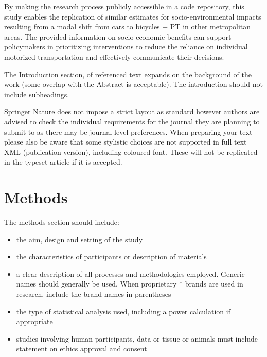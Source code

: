 \documentclass[sn-apa,referee,pdflatex]{sn-jnl}
\providecommand{\tightlist}{%
  \setlength{\itemsep}{0pt}\setlength{\parskip}{0pt}}
\begin{document}
By making the research process publicly accessible in a code repository,
this study enables the replication of similar estimates for
socio-environmental impacts resulting from a modal shift from cars to
bicycles + PT in other metropolitan areas. The provided information on
socio-economic benefits can support policymakers in prioritizing
interventions to reduce the reliance on individual motorized
transportation and effectively communicate their decisions.

The Introduction section, of referenced text \citet{bib1} expands on the
background of the work (some overlap with the Abstract is acceptable).
The introduction should not include subheadings.

Springer Nature does not impose a strict layout as standard however
authors are advised to check the individual requirements for the journal
they are planning to submit to as there may be journal-level
preferences. When preparing your text please also be aware that some
stylistic choices are not supported in full text XML (publication
version), including coloured font. These will not be replicated in the
typeset article if it is accepted.

\hypertarget{sec2}{%
\section{Methods}\label{sec2}}

The methods section should include:

\begin{itemize}
\tightlist
\item
  the aim, design and setting of the study
\item
  the characteristics of participants or description of materials
\item
  a clear description of all processes and methodologies employed.
  Generic names should generally be used. When proprietary * brands are
  used in research, include the brand names in parentheses
\item
  the type of statistical analysis used, including a power calculation
  if appropriate
\item
  studies involving human participants, data or tissue or animals must
  include statement on ethics approval and consent
\end{itemize}
\end{document}
